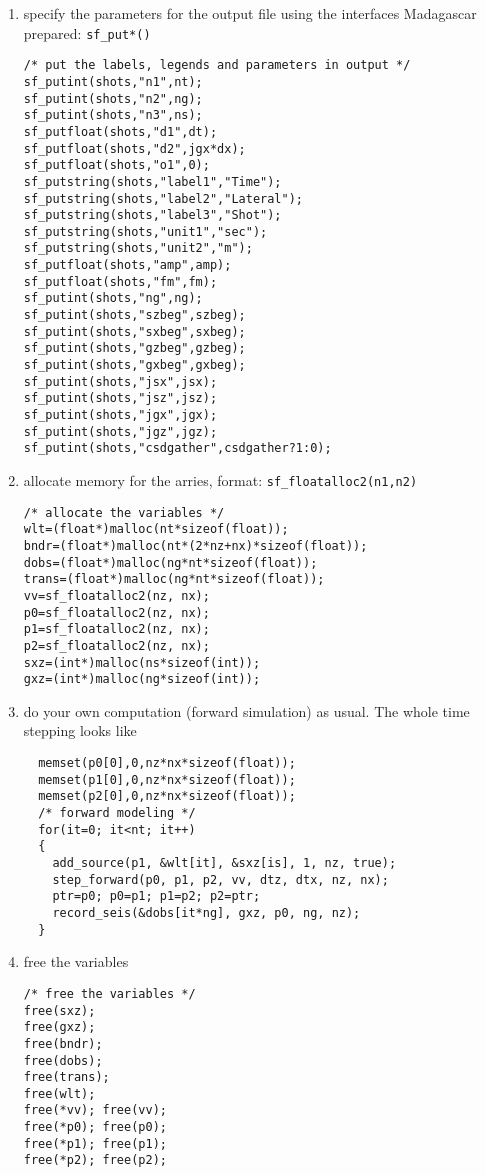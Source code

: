 \begin{enumerate}
 
 \item specify the parameters for the output file using the interfaces Madagascar prepared: \texttt{sf\_put*()}
 \begin{lstlisting}
/* put the labels, legends and parameters in output */
sf_putint(shots,"n1",nt);
sf_putint(shots,"n2",ng);
sf_putint(shots,"n3",ns);
sf_putfloat(shots,"d1",dt);
sf_putfloat(shots,"d2",jgx*dx);
sf_putfloat(shots,"o1",0);
sf_putstring(shots,"label1","Time");
sf_putstring(shots,"label2","Lateral");
sf_putstring(shots,"label3","Shot");
sf_putstring(shots,"unit1","sec");
sf_putstring(shots,"unit2","m");
sf_putfloat(shots,"amp",amp);
sf_putfloat(shots,"fm",fm);
sf_putint(shots,"ng",ng);
sf_putint(shots,"szbeg",szbeg);
sf_putint(shots,"sxbeg",sxbeg);
sf_putint(shots,"gzbeg",gzbeg);
sf_putint(shots,"gxbeg",gxbeg);
sf_putint(shots,"jsx",jsx);
sf_putint(shots,"jsz",jsz);
sf_putint(shots,"jgx",jgx);
sf_putint(shots,"jgz",jgz);
sf_putint(shots,"csdgather",csdgather?1:0);
 \end{lstlisting}


 \item allocate memory for the arries, format: \texttt{sf\_floatalloc2(n1,n2)}
 \begin{lstlisting}
/* allocate the variables */
wlt=(float*)malloc(nt*sizeof(float));
bndr=(float*)malloc(nt*(2*nz+nx)*sizeof(float));
dobs=(float*)malloc(ng*nt*sizeof(float));
trans=(float*)malloc(ng*nt*sizeof(float));
vv=sf_floatalloc2(nz, nx);
p0=sf_floatalloc2(nz, nx);
p1=sf_floatalloc2(nz, nx);
p2=sf_floatalloc2(nz, nx);
sxz=(int*)malloc(ns*sizeof(int));
gxz=(int*)malloc(ng*sizeof(int));
 \end{lstlisting}

 \item do your own computation (forward simulation) as usual. The whole time stepping looks like
  \begin{lstlisting}
  memset(p0[0],0,nz*nx*sizeof(float));
  memset(p1[0],0,nz*nx*sizeof(float));
  memset(p2[0],0,nz*nx*sizeof(float));
  /* forward modeling */
  for(it=0; it<nt; it++)
  {
    add_source(p1, &wlt[it], &sxz[is], 1, nz, true);
    step_forward(p0, p1, p2, vv, dtz, dtx, nz, nx);
    ptr=p0; p0=p1; p1=p2; p2=ptr;
    record_seis(&dobs[it*ng], gxz, p0, ng, nz);
  }  
  \end{lstlisting}
  
 \item free the variables
 \begin{lstlisting}
/* free the variables */
free(sxz);
free(gxz);
free(bndr);
free(dobs);
free(trans);
free(wlt);
free(*vv); free(vv);
free(*p0); free(p0);
free(*p1); free(p1);
free(*p2); free(p2);


\end{lstlisting}
\end{enumerate}
